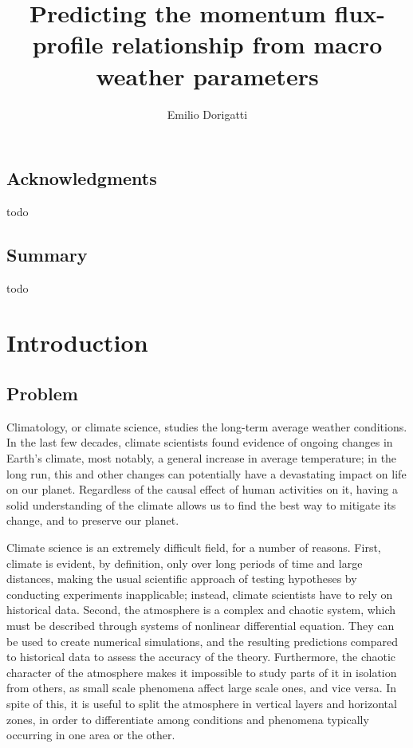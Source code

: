 \documentclass[a4paper]{book}
\begin{document}
\title{Predicting the momentum flux-profile relationship from  macro weather parameters}
\author{Emilio Dorigatti}


\maketitle
\restoregeometry


\section*{Acknowledgments}
todo

\newpage

\section*{Summary}
todo

\tableofcontents

\listoffigures

\listoftables

\chapter{Introduction}

\section{Problem}
\label{sec:problem}
Climatology, or climate science, studies the long-term average weather conditions. In the last few decades, climate scientists found evidence of ongoing changes in Earth's climate, most notably, a general increase in average temperature; in the long run, this and other changes can potentially have a devastating impact on life on our planet. Regardless of the causal effect of human activities on it, having a solid understanding of the climate allows us to find the best way to mitigate its change, and to preserve our planet.

Climate science is an extremely difficult field, for a number of reasons. First, climate is evident, by definition, only over long periods of time and large distances, making the usual scientific approach of testing hypotheses by conducting experiments inapplicable; instead, climate scientists have to rely on historical data. Second, the atmosphere is a complex and chaotic system, which must be described through systems of nonlinear differential equation. They can be used to create numerical simulations, and the resulting predictions compared to historical data to assess the accuracy of the theory. Furthermore, the chaotic character of the atmosphere makes it impossible to study parts of it in isolation from others, as small scale phenomena affect large scale ones, and vice versa. In spite of this, it is useful to split the atmosphere in vertical layers and horizontal zones, in order to differentiate among conditions and phenomena typically occurring in one area or the other.
\end{document}
